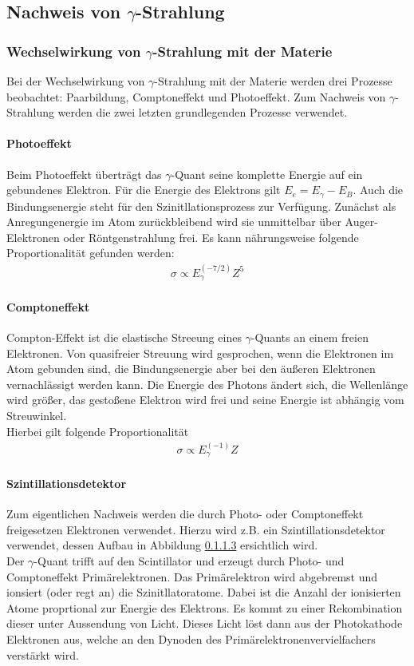 \documentclass[a4paper,twoside,final]{article}
\begin{document}
\subsection{Nachweis von $\gamma$-Strahlung}
\subsubsection{Wechselwirkung von $\gamma$-Strahlung mit der Materie}
Bei der Wechselwirkung von $\gamma$-Strahlung mit der Materie werden drei Prozesse beobachtet: Paarbildung, Comptoneffekt und Photoeffekt. Zum Nachweis von $\gamma$-Strahlung werden die zwei letzten grundlegenden Prozesse verwendet.
\paragraph{Photoeffekt}
Beim Photoeffekt überträgt das $\gamma$-Quant seine komplette Energie auf ein gebundenes Elektron. Für die Energie des Elektrons gilt $E_e = E_\gamma - E_B$. Auch die Bindungsenergie steht für den Szinitllationsprozess zur Verfügung. Zunächst als Anregungenergie im Atom zurückbleibend wird sie unmittelbar über Auger-Elektronen oder Röntgenstrahlung frei. Es kann nährungsweise folgende Proportionalität gefunden werden:
\begin{align}
\sigma  \propto E_\gamma ^(-7/2) Z^5
\end{align}
\paragraph{Comptoneffekt}
Compton-Effekt ist die elastische Streeung eines $\gamma$-Quants an einem freien Elektronen. Von quasifreier Streuung wird gesprochen, wenn die Elektronen im Atom gebunden sind, die Bindungsenergie aber bei den äußeren Elektronen vernachlässigt werden kann. Die Energie des Photons ändert sich, die Wellenlänge wird größer, das gestoßene Elektron wird frei und seine Energie ist abhängig vom Streuwinkel. \\
Hierbei gilt folgende Proportionalität
\begin{align}
\sigma \propto E_{\gamma} ^(-1) Z
\end{align}


\paragraph{Szintillationsdetektor}
Zum eigentlichen Nachweis werden die durch Photo- oder Comptoneffekt freigesetzen Elektronen verwendet. Hierzu wird z.B. ein Szintillationsdetektor verwendet, dessen Aufbau in Abbildung \ref{} ersichtlich wird.\\
Der $\gamma$-Quant trifft auf den Scintillator und erzeugt durch Photo- und Comptoneffekt Primärelektronen. Das Primärelektron wird abgebremst und ionsiert (oder regt an) die Szinitllatoratome. Dabei ist die Anzahl der ionisierten Atome proprtional zur Energie des Elektrons. Es kommt zu einer Rekombination dieser unter Aussendung von Licht. Dieses Licht löst dann aus der Photokathode Elektronen aus, welche an den Dynoden des Primärelektronenvervielfachers verstärkt wird.
\end{document}
